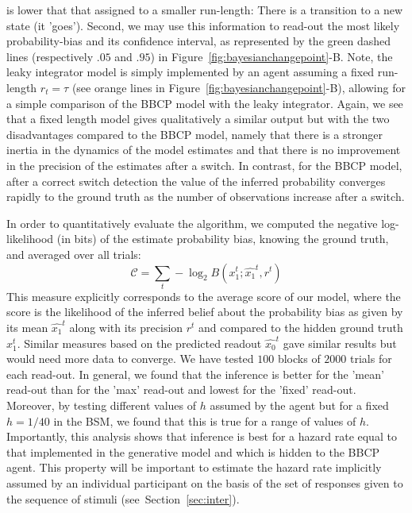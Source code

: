 \documentclass[12pt,english]{article}%
\newcommand{\eql}[1]{\begin{equation}#1\end{equation}}
\newcommand{\Cc}{\mathcal{C}}
\newcommand{\seeFig}[1]{Figure~\ref{fig:#1}}
\newcommand{\seeSec}[1]{Section~\ref{sec:#1}}
\begin{document}
is lower that that assigned to a smaller run-length:
There is a transition to a new state (it 'goes').
Second, we may use this information to read-out the most likely probability-bias and its confidence interval,
as represented by the green dashed lines (respectively $.05$ and $.95$) in \seeFig{bayesianchangepoint}-B.
Note, the leaky integrator model is simply implemented
by an agent assuming a fixed run-length $r_t=\tau$ (see orange lines in \seeFig{bayesianchangepoint}-B),
allowing for a simple comparison of the BBCP model with the leaky integrator.
Again, we see that a fixed length model gives qualitatively a similar output
but with the two disadvantages compared to the BBCP model, namely that 
there is a stronger inertia in the dynamics of the model estimates and 
that there is no improvement in the precision of the estimates after a switch.
In contrast, for the BBCP model, after a correct switch detection
the value of the inferred probability converges rapidly to the ground truth
as the number of observations increase after a switch.


In order to quantitatively evaluate the algorithm,
we computed the  negative log-likelihood (in bits) of the estimate probability bias,
knowing the ground truth,
and averaged over all trials:
\eql{
\Cc =  \sum_{t} -\log_2 B(x_1^t ; \hat{x_1}^t, r^t )
\label{eq:MI}
}
This measure explicitly corresponds to the average score of our model,
where the score is the likelihood of the inferred belief about the probability bias
as given by its mean $\hat{x_1}^t$ along with its precision $r^t$ and
compared to the hidden ground truth $x_1^t$.
Similar measures based on the predicted readout $\hat{x_0}^t$
gave similar results but would need more data to converge.
We have tested $100$ blocks of $2000$ trials for each read-out.
In general, we found that the inference is better for the 'mean' read-out
than for the 'max' read-out and lowest for the 'fixed' read-out.
Moreover, by testing different values of $h$ assumed by the agent
but for a fixed $h=1/40$ in the BSM,
we found that this is true for a range of values of $h$.
Importantly, this analysis shows that inference is best for a hazard rate
equal to that implemented in the generative model and which is hidden to the BBCP agent.
This property will be important to estimate the hazard rate implicitly assumed by an individual participant
on the basis of the set of responses given to the  sequence of stimuli
(see~\seeSec{inter}).
\end{document}
